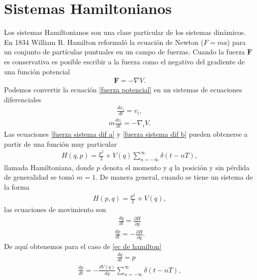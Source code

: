 \section{Sistemas Hamiltonianos}
Los sistemas Hamiltonianos son una clase particular de los sistemas dinámicos. En 1834 William R. Hamilton reformuló la ecuación de Newton ($F=ma$) para un conjunto de partículas puntuales en un campo de fuerzas. Cuando la fuerza $\mathbf{F}$ es conservativa es posible escribir a la fuerza como  el negativo del gradiente de una función potencial
\begin{eqnarray}
\mathbf{F}=-\nabla V. \label{fuerza potencial}
\end{eqnarray}
Podemos convertir la ecuación \eqref{fuerza potencial} en un sistemas de ecuaciones diferenciales
\begin{eqnarray}
\frac{dx_{i}}{dt}=v_{i},
\label{fuerza sistema dif a}
\end{eqnarray}
\begin{eqnarray}
m\frac{dv_{i}}{dt}=-\nabla_{i} V.
\label{fuerza sistema dif b}
\end{eqnarray}
Las ecuaciones \eqref{fuerza sistema dif a} y \eqref{fuerza sistema dif b} pueden obtenerse a partir de una función muy particular
\begin{eqnarray}
H(q,p)=\frac{p^{2}}{2}+V(q)\sum_{n=-\infty}^{\infty}\delta(t-nT), 
\label{ec de hamilton} 
\end{eqnarray}
llamada Hamiltoniana, donde $p$ denota el momento y $q$ la posición y sin pérdida de generalidad se tomó $m=1$. De manera general, cuando se tiene un sistema de la forma
\begin{eqnarray}
H(p,q)=\frac{p^{2}}{2}+V(q),
\label{Hamiltoniano-general}
\end{eqnarray}
las ecuaciones de movimiento son
\begin{eqnarray}
\frac{dq}{dt}=\frac{\partial H}{\partial p}
\label{1ec de mov}
\end{eqnarray}
\begin{eqnarray}
\frac{dp}{dt}=-\frac{\partial H}{\partial q}.
\label{2ec de mov}
\end{eqnarray}
De aquí obtenemos para el caso de \eqref{ec de hamilton}
\begin{eqnarray}
\frac{dq}{dt}=p\quad
\label{SistemaH1}
\end{eqnarray}
\begin{eqnarray}
\frac{dp}{dt}=-\frac{dV(q)}{dq}\sum_{n=-\infty}^{\infty}\delta(t-nT),
\label{SistemaH2}
\end{eqnarray}
